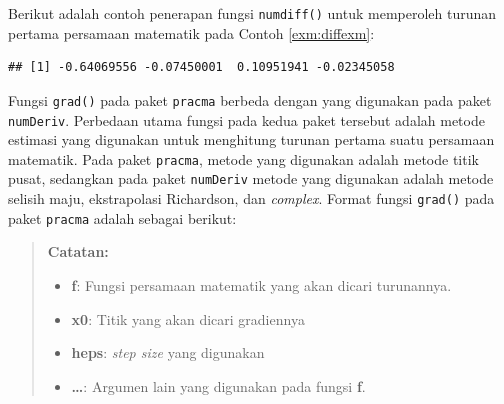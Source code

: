 \documentclass[]{book}
\newenvironment{Shaded}{\begin{snugshade}}{\end{snugshade}}
\newcommand{\ControlFlowTok}[1]{\textcolor[rgb]{0.13,0.29,0.53}{\textbf{#1}}}
\newcommand{\DataTypeTok}[1]{\textcolor[rgb]{0.13,0.29,0.53}{#1}}
\newcommand{\DecValTok}[1]{\textcolor[rgb]{0.00,0.00,0.81}{#1}}
\newcommand{\KeywordTok}[1]{\textcolor[rgb]{0.13,0.29,0.53}{\textbf{#1}}}
\newcommand{\NormalTok}[1]{#1}
\newcommand{\OperatorTok}[1]{\textcolor[rgb]{0.81,0.36,0.00}{\textbf{#1}}}
\providecommand{\tightlist}{%
  \setlength{\itemsep}{0pt}\setlength{\parskip}{0pt}}
\theoremstyle{definition}
\theoremstyle{definition}
\theoremstyle{definition}
\theoremstyle{remark}
\begin{document}
Berikut adalah contoh penerapan fungsi \texttt{numdiff()} untuk memperoleh turunan pertama persamaan matematik pada Contoh \ref{exm:diffexm}:

\begin{Shaded}
\end{Shaded}

\begin{verbatim}
## [1] -0.64069556 -0.07450001  0.10951941 -0.02345058
\end{verbatim}

Fungsi \texttt{grad()} pada paket \texttt{pracma} berbeda dengan yang digunakan pada paket \texttt{numDeriv}. Perbedaan utama fungsi pada kedua paket tersebut adalah metode estimasi yang digunakan untuk menghitung turunan pertama suatu persamaan matematik. Pada paket \texttt{pracma}, metode yang digunakan adalah metode titik pusat, sedangkan pada paket \texttt{numDeriv} metode yang digunakan adalah metode selisih maju, ekstrapolasi Richardson, dan \emph{complex}. Format fungsi \texttt{grad()} pada paket \texttt{pracma} adalah sebagai berikut:

\begin{Shaded}
\end{Shaded}

\begin{quote}
\textbf{Catatan:}

\begin{itemize}
\tightlist
\item
  \textbf{f}: Fungsi persamaan matematik yang akan dicari turunannya.
\item
  \textbf{x0}: Titik yang akan dicari gradiennya
\item
  \textbf{heps}: \emph{step size} yang digunakan
\item
  \textbf{\ldots{}}: Argumen lain yang digunakan pada fungsi \textbf{f}.
\end{itemize}
\end{quote}
\end{document}
